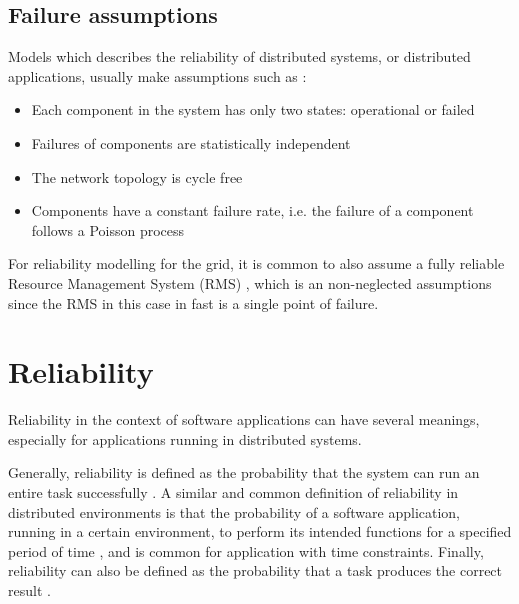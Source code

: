 \documentclass{cslthse-msc}
\begin{document}
\subsection{Failure assumptions}
Models which describes the reliability of distributed systems, or distributed applications, usually make assumptions such as \cite{relModelDistSimSystem} \cite{relModelAnalysis}  \cite{cloudServiceRel} \cite{studyServiceRel} \cite{hierarchicalRelModeling} \cite{selfAdaptRel}:
\begin{itemize}
	\item Each component in the system has only two states: operational or failed
	\item Failures of components are statistically independent
	\item The network topology is cycle free
	\item Components have a constant failure rate, i.e. the failure of a component follows a Poisson process
\end{itemize}

For reliability modelling for the grid, it is common to also assume a fully reliable Resource Management System (RMS) \cite{relAndPerfGridServices} \cite{relGridServicePredConstraint}, which is an non-neglected assumptions since the RMS in this case in fast is a single point of failure.

\section{Reliability} \label{sec:theory_reliability}
Reliability in the context of software applications can have several meanings, especially for applications running in distributed systems.

Generally, reliability is defined as the probability that the system can run an entire task successfully \cite{taskAllocation} \cite{relModelDistSimSystem} \cite{studyServiceRel} \cite{hierarchicalRelModeling} \cite{generalAlgoRelEval} \cite{realTimeRelAnalysis} \cite{selfAdaptRel} \cite{perfRelNonMarkovian}. A similar and common definition of reliability in distributed environments is that the probability of a software application, running in a certain environment, to perform its intended functions for a specified period of time \cite{surveyReliabilityDistr} \cite{surveyRelPrediction} \cite{relDistApplications} \cite{surveyReliabilityDistr}, and is common for application with time constraints. Finally, reliability can also be defined as the probability that a task produces the correct result \cite{surveyRelPrediction} \cite{relAndPerfGridServices} \cite{relGridServicePredConstraint} \cite{relModelWebServices} \cite{selfAdaptRel}. 
\end{document}
